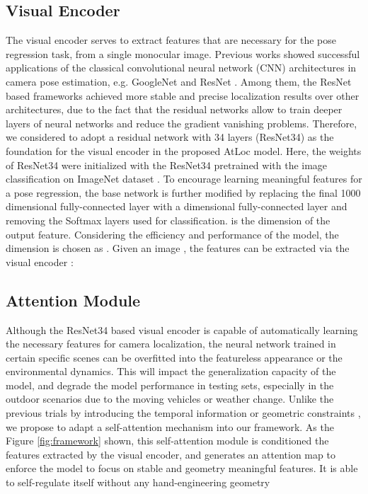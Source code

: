 \documentclass[letterpaper]{article}
\begin{document}
\subsection{Visual Encoder}
The visual encoder serves to extract features that are necessary for the pose regression task, from a single monocular image.
Previous works\cite{kendall2017geometric,brahmbhatt2018geometry} showed successful applications of the classical convolutional neural network (CNN) architectures in camera pose estimation, e.g. GoogleNet \cite{szegedy2015going} and ResNet \cite{he2016deep}. 
Among them, the ResNet based \cite{brahmbhatt2018geometry} frameworks achieved more stable and precise localization results over other architectures, due to the fact that the residual networks allow to train deeper layers of neural networks and reduce the gradient vanishing problems. Therefore, we considered to adopt a residual network with 34 layers (ResNet34) as the foundation for the visual encoder in the proposed AtLoc model.
Here, the weights of ResNet34 were initialized with the ResNet34 pretrained with the image classification on ImageNet dataset \cite{imagenet}. 
To encourage learning meaningful features for a pose regression, the base network is further modified by replacing the final 1000 dimensional fully-connected layer with a  dimensional fully-connected layer and removing the Softmax layers used for classification.  is the dimension of the output feature. Considering the efficiency and performance of the model, the dimension is chosen as . Given an image , the features  can be extracted via the visual encoder :




\subsection{Attention Module}
Although the ResNet34 based visual encoder is capable of automatically learning the necessary features for camera localization, the neural network trained in certain specific scenes can be overfitted into the featureless appearance or the environmental dynamics. This will impact the generalization capacity of the model, and degrade the model performance in testing sets, especially in the outdoor scenarios due to the moving vehicles or weather change. Unlike the previous trials by introducing the temporal information \cite{clark2017vidloc} or geometric constraints \cite{brahmbhatt2018geometry}, we propose to adapt a self-attention mechanism into our framework. As the Figure \ref{fig:framework} shown, this self-attention module is conditioned the features extracted by the visual encoder, and generates an attention map to enforce the model to focus on stable and geometry meaningful features. 
It is able to self-regulate itself without any hand-engineering geometry 
\end{document}
